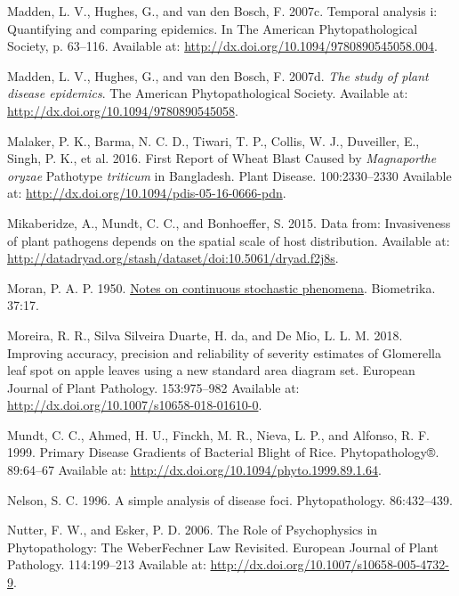 \documentclass[
  letterpaper,
]{book}
\newlength{\cslhangindent}
\newlength{\cslentryspacingunit} %
\newenvironment{CSLReferences}[2] %
 {%
  \setlength{\parindent}{0pt}
  \ifodd #1
  \let\oldpar\par
  \def\par{\hangindent=\cslhangindent\oldpar}
  \fi
  \setlength{\parskip}{#2\cslentryspacingunit}
 }%
 {}
\begin{document}
\begin{CSLReferences}{0}{0}
\leavevmode{}%
Madden, L. V., Hughes, G., and van den Bosch, F. 2007c. Temporal
analysis i: Quantifying and comparing epidemics. In The American
Phytopathological Society, p. 63--116. Available at:
\url{http://dx.doi.org/10.1094/9780890545058.004}.

\leavevmode{}%
Madden, L. V., Hughes, G., and van den Bosch, F. 2007d. \emph{The study
of plant disease epidemics}. The American Phytopathological Society.
Available at: \url{http://dx.doi.org/10.1094/9780890545058}.

\leavevmode{}%
Malaker, P. K., Barma, N. C. D., Tiwari, T. P., Collis, W. J.,
Duveiller, E., Singh, P. K., et al. 2016. First Report of Wheat Blast
Caused by {\emph{Magnaporthe oryzae}} Pathotype {\emph{triticum}} in
Bangladesh. Plant Disease. 100:2330--2330 Available at:
\url{http://dx.doi.org/10.1094/pdis-05-16-0666-pdn}.

\leavevmode{}%
Mikaberidze, A., Mundt, C. C., and Bonhoeffer, S. 2015. Data from:
Invasiveness of plant pathogens depends on the spatial scale of host
distribution. Available at:
\url{http://datadryad.org/stash/dataset/doi:10.5061/dryad.f2j8s}.

\leavevmode{}%
Moran, P. A. P. 1950. \href{https://doi.org/10.2307/2332142}{Notes on
continuous stochastic phenomena}. Biometrika. 37:17.

\leavevmode{}%
Moreira, R. R., Silva Silveira Duarte, H. da, and De Mio, L. L. M. 2018.
Improving accuracy, precision and reliability of severity estimates of
Glomerella leaf spot on apple leaves using a new standard area diagram
set. European Journal of Plant Pathology. 153:975--982 Available at:
\url{http://dx.doi.org/10.1007/s10658-018-01610-0}.

\leavevmode{}%
Mundt, C. C., Ahmed, H. U., Finckh, M. R., Nieva, L. P., and Alfonso, R.
F. 1999. Primary Disease Gradients of Bacterial Blight of Rice.
Phytopathology®. 89:64--67 Available at:
\url{http://dx.doi.org/10.1094/phyto.1999.89.1.64}.

\leavevmode{}%
Nelson, S. C. 1996. A simple analysis of disease foci. Phytopathology.
86:432--439.

\leavevmode{}%
Nutter, F. W., and Esker, P. D. 2006. The Role of Psychophysics in
Phytopathology: The Weber{\textendash}Fechner Law Revisited. European
Journal of Plant Pathology. 114:199--213 Available at:
\url{http://dx.doi.org/10.1007/s10658-005-4732-9}.


\end{CSLReferences}
\end{document}

